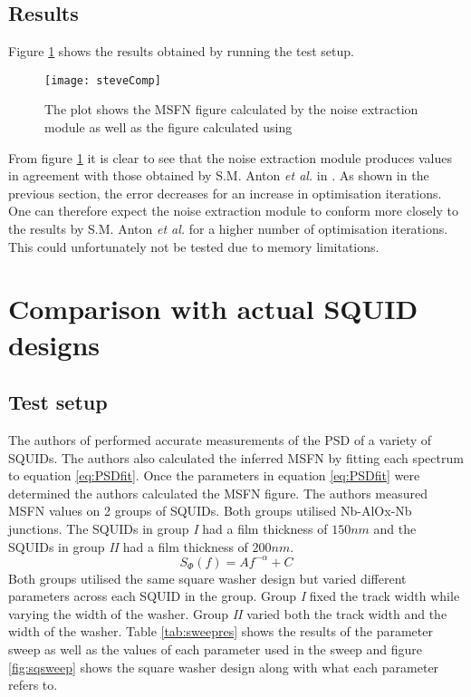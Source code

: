 \subsection{Results}
Figure \ref{fig:steveComp} shows the results obtained by running the test setup. 
\begin{figure}[H]

    \centering
    \texttt{[image: steveComp]}
    \caption{The plot shows the MSFN figure calculated by the noise extraction module as well as the figure calculated using \cite{msfnCode}}
    \label{fig:steveComp}
\end{figure}
From figure \ref{fig:steveComp} it is clear to see that the noise extraction module produces values in agreement with those obtained by S.M. Anton \textit{et al.} in \cite{fluxNoiseSquidsStevenAnton}. As shown in the previous section, the error decreases for an increase in optimisation iterations. One can therefore expect the noise extraction module to conform more closely to the results by S.M. Anton \textit{et al.} for a higher number of optimisation iterations. This could unfortunately not be tested due to memory limitations.

\section{Comparison with actual SQUID designs}
\subsection{Test setup}
The authors of \cite{fluxNoiseSquidsStevenAnton} performed accurate measurements of the PSD of a variety of SQUIDs. The authors also calculated the inferred MSFN by fitting each spectrum to equation \ref{eq:PSDfit}. Once the parameters in equation \ref{eq:PSDfit} were determined the authors calculated the MSFN figure. The authors measured MSFN values on 2 groups of SQUIDs. Both groups utilised Nb-AlOx-Nb junctions. The SQUIDs in group \textit{I} had a film thickness of $150 nm$ and the SQUIDs in group \textit{II} had a film thickness of $200 nm$. 
\begin{equation}
    S_\Phi (f) = Af^{-\alpha}+C
    \label{eq:PSDfit}
\end{equation}
Both groups utilised the same square washer design but varied different parameters across each SQUID in the group. Group \textit{I} fixed the track width while varying the width of the washer. Group \textit{II} varied both the track width and the width of the washer. Table \ref{tab:sweepres} shows the results of the parameter sweep as well as the values of each parameter used in the sweep and figure \ref{fig:sqsweep} shows the square washer design along with what each parameter refers to.

